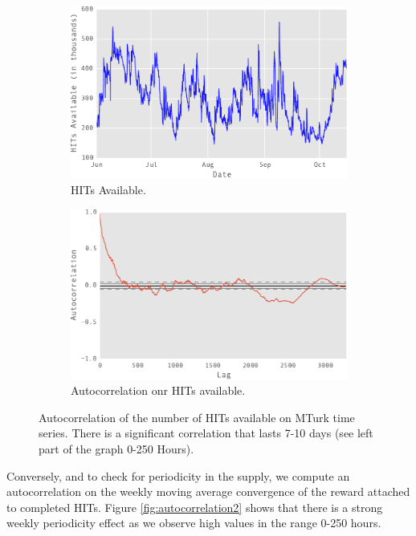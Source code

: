 \begin{figure}[tb]
    \centering
    \begin{subfigure}[b]{0.48\textwidth}
        \centering
        \includegraphics[width=\textwidth]{figures/out}
        \caption{HITs Available.}
        \label{fig:y equals x}
    \end{subfigure}
    \hfill
    \begin{subfigure}[b]{0.48\textwidth}
        \centering
        \includegraphics[width=\textwidth]{figures/out1}
        \caption{Autocorrelation onr HITs available.}
        \label{fig:three sin x}
    \end{subfigure}
    \hfill 
    \caption{Autocorrelation of the number of HITs available on MTurk time series. There is a significant correlation that lasts 7-10 days (see left part of the graph 0-250 Hours).}
	\label{fig:autocorrelation1}
\end{figure} 

Conversely, and to check for periodicity in the supply, we compute an autocorrelation on the weekly moving average convergence of the reward attached to completed HITs. Figure \ref{fig:autocorrelation2} shows that there is a strong weekly periodicity effect as we observe high values in the range 0-250 hours.

